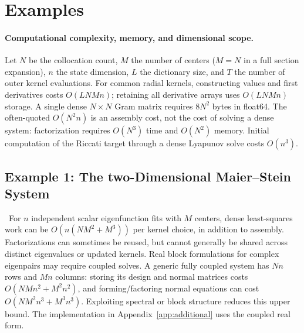 \documentclass[11pt]{article}
\theoremstyle{plain}      %
\theoremstyle{definition} %
\providecommand{\DIFaddtex}[1]{{\protect\color{blue}#1}} %
\providecommand{\DIFdeltex}[1]{{\protect\color{red}#1}} %
\providecommand{\DIFaddbegin}{} %
\providecommand{\DIFaddend}{} %
\providecommand{\DIFdelbegin}{} %
\providecommand{\DIFdelend}{} %
\providecommand{\DIFadd}[1]{\texorpdfstring{\DIFaddtex{#1}}{#1}} %
\providecommand{\DIFdel}[1]{\texorpdfstring{\DIFdeltex{#1}}{}} %
\newcommand{\DIFscaledelfig}{1.0}
\newlength{\DIFdelgraphicswidth} %
\newlength{\DIFdelgraphicsheight} %
\newcommand{\DIFaddincludegraphics}[2][]{{\color{blue}\fbox{\DIFOincludegraphics[#1]{#2}}}} %
\newcommand{\DIFdelincludegraphics}[2][]{%
\sbox{\DIFdelgraphicsbox}{\DIFOincludegraphics[#1]{#2}}%
\settoboxwidth{\DIFdelgraphicswidth}{\DIFdelgraphicsbox} %
\settoboxtotalheight{\DIFdelgraphicsheight}{\DIFdelgraphicsbox} %
\scalebox{\DIFscaledelfig}{%
\parbox[b]{\DIFdelgraphicswidth}{\usebox{\DIFdelgraphicsbox}\\[-\baselineskip] \rule{\DIFdelgraphicswidth}{0em}}\llap{\resizebox{\DIFdelgraphicswidth}{\DIFdelgraphicsheight}{%
\setlength{\unitlength}{\DIFdelgraphicswidth}%
\begin{picture}(1,1)%
\thicklines\linethickness{2pt} %
{\color[rgb]{1,0,0}\put(0,0){\framebox(1,1){}}}%
{\color[rgb]{1,0,0}\put(0,0){\line( 1,1){1}}}%
{\color[rgb]{1,0,0}\put(0,1){\line(1,-1){1}}}%
\end{picture}%
}\hspace*{3pt}}} %
} %
\DeclareRobustCommand{\DIFaddbegin}{\DIFOaddbegin \let\includegraphics\DIFaddincludegraphics} %
\DeclareRobustCommand{\DIFaddend}{\DIFOaddend \let\includegraphics\DIFOincludegraphics} %
\DeclareRobustCommand{\DIFdelbegin}{\DIFOdelbegin \let\includegraphics\DIFdelincludegraphics} %
\DeclareRobustCommand{\DIFdelend}{\DIFOaddend \let\includegraphics\DIFOincludegraphics} %
\begin{document}
\DIFdelbegin \section{\DIFdel{Examples}}
\addtocounter{section}{-1}%
\DIFdelend \DIFaddbegin \paragraph{\DIFadd{Computational complexity, memory, and dimensional scope.}}\label{sec:complexity-full}
\DIFadd{Let $N$ be the collocation count, $M$ the number of centers ($M=N$ in a full section expansion), $n$ the state dimension, $L$ the dictionary size, and $T$ the number of outer kernel evaluations. For common radial kernels, constructing values and first derivatives costs $O(LNMn)$; retaining all derivative arrays uses $O(LNMn)$ storage. A single dense $N\times N$ Gram matrix requires $8N^2$ bytes in float64. The often-quoted $O(N^2n)$ is an assembly cost, not the cost of solving a dense system: factorization requires $O(N^3)$ time and $O(N^2)$ memory. Initial computation of the Riccati target through a dense Lyapunov solve costs $O(n^3)$.
}\DIFaddend 

\DIFdelbegin \subsection{\DIFdel{Example 1: The two-Dimensional Maier--Stein System}}%
\addtocounter{subsection}{-1}%
\DIFdelend\ \DIFaddbegin \DIFadd{For $n$ independent scalar eigenfunction fits with $M$ centers, dense least-squares work can be $O(n(NM^2+M^3))$ per kernel choice, in addition to assembly. Factorizations can sometimes be reused, but cannot generally be shared across distinct eigenvalues or updated kernels. Real block formulations for complex eigenpairs may require coupled solves. A generic fully coupled system has $Nn$ rows and $Mn$ columns: storing its design and normal matrices costs $O(NMn^2+M^2n^2)$, and forming/factoring normal equations can cost $O(NM^2n^3+M^3n^3)$. Exploiting spectral or block structure reduces this upper bound. The implementation in Appendix~\ref{app:additional} uses the coupled real form.
}\DIFaddend 
\end{document}
